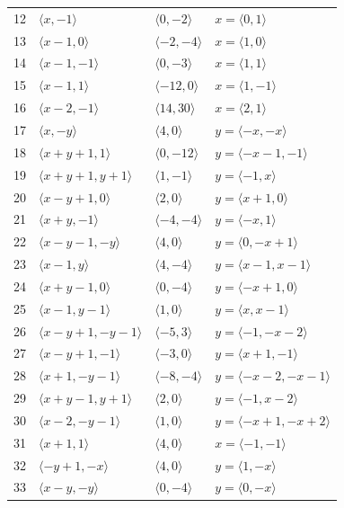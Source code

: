 \documentclass[11pt]{article}
\begin{document}
\begin{longtable}{@{}rlll@{}}
12 & $\langle x,-1\rangle$ & $\langle 0,-2\rangle$ & $x=\langle 0,1\rangle$\\
13 & $\langle x-1,0\rangle$ & $\langle -2,-4\rangle$ & $x=\langle 1,0\rangle$\\
14 & $\langle x-1,-1\rangle$ & $\langle 0,-3\rangle$ & $x=\langle 1,1\rangle$\\
15 & $\langle x-1,1\rangle$ & $\langle -12,0\rangle$ & $x=\langle 1,-1\rangle$\\
16 & $\langle x-2,-1\rangle$ & $\langle 14,30\rangle$ & $x=\langle 2,1\rangle$\\
17 & $\langle x,-y\rangle$ & $\langle 4,0\rangle$ & $y=\langle -x,-x\rangle$\\
18 & $\langle x+y+1,1\rangle$ & $\langle 0,-12\rangle$ & $y=\langle -x-1,-1\rangle$\\
19 & $\langle x+y+1,y+1\rangle$ & $\langle 1,-1\rangle$ & $y=\langle -1,x\rangle$\\
20 & $\langle x-y+1,0\rangle$ & $\langle 2,0\rangle$ & $y=\langle x+1,0\rangle$\\
21 & $\langle x+y,-1\rangle$ & $\langle -4,-4\rangle$ & $y=\langle -x,1\rangle$\\
22 & $\langle x-y-1,-y\rangle$ & $\langle 4,0\rangle$ & $y=\langle 0,-x+1\rangle$\\
23 & $\langle x-1,y\rangle$ & $\langle 4,-4\rangle$ & $y=\langle x-1,x-1\rangle$\\
24 & $\langle x+y-1,0\rangle$ & $\langle 0,-4\rangle$ & $y=\langle -x+1,0\rangle$\\
25 & $\langle x-1,y-1\rangle$ & $\langle 1,0\rangle$ & $y=\langle x,x-1\rangle$\\
26 & $\langle x-y+1,-y-1\rangle$ & $\langle -5,3\rangle$ & $y=\langle -1,-x-2\rangle$\\
27 & $\langle x-y+1,-1\rangle$ & $\langle -3,0\rangle$ & $y=\langle x+1,-1\rangle$\\
28 & $\langle x+1,-y-1\rangle$ & $\langle -8,-4\rangle$ & $y=\langle -x-2,-x-1\rangle$\\
29 & $\langle x+y-1,y+1\rangle$ & $\langle 2,0\rangle$ & $y=\langle -1,x-2\rangle$\\
30 & $\langle x-2,-y-1\rangle$ & $\langle 1,0\rangle$ & $y=\langle -x+1,-x+2\rangle$\\
31 & $\langle x+1,1\rangle$ & $\langle 4,0\rangle$ & $x=\langle -1,-1\rangle$\\
32 & $\langle -y+1,-x\rangle$ & $\langle 4,0\rangle$ & $y=\langle 1,-x\rangle$\\
33 & $\langle x-y,-y\rangle$ & $\langle 0,-4\rangle$ & $y=\langle 0,-x\rangle$\\

\end{longtable}
\end{document}
